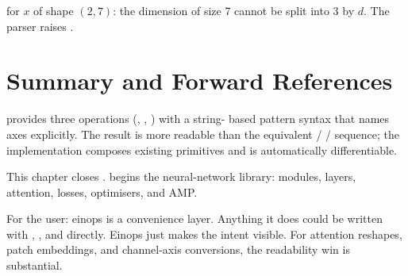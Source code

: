  for $x$ of shape
$(2, 7)$: the dimension of size 7 cannot be split into 3 by $d$.
The parser raises .

\section{Summary and Forward References}
\label{sec:einops:summary}

 provides three operations
(, , ) with a string-
based pattern syntax that names axes explicitly. The result is
more readable than the equivalent  /
 /  sequence; the implementation
composes existing primitives and is automatically differentiable.

This chapter closes .
 begins the neural-network library:
modules, layers, attention, losses, optimisers, and AMP.

\begin{lucidnote}
For the user: einops is a convenience layer. Anything it does
could be written with , , and
 directly. Einops just makes the intent visible. For
attention reshapes, patch embeddings, and channel-axis
conversions, the readability win is substantial.
\end{lucidnote}

